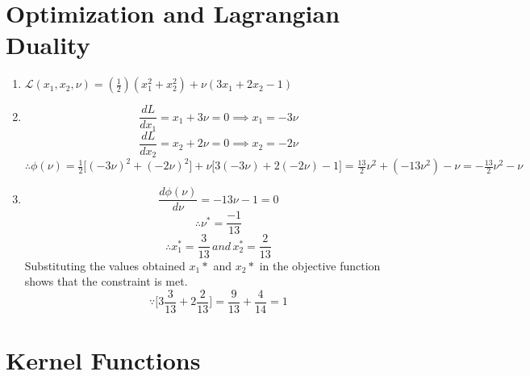 \documentclass[english]{article}
\begin{document}
\section{Optimization and Lagrangian Duality}
\label{sec:optimization}
\begin{enumerate}
	\item 
	${\mathcal{L}}(x_1,x_2,\nu) = (\frac{1}{2})(x_1^2 + x_2^2) + \nu(3x_1 + 2x_2 - 1)$
	\item 
	$$\frac{dL}{dx_1} = x_1 + 3\nu = 0 \implies x_1 = -3\nu$$
	$$\frac{dL}{dx_2} = x_2 + 2\nu = 0 \implies x_2 = -2\nu$$
	$\therefore \phi(\nu) = \frac{1}{2}\big[(-3\nu)^2 + (-2\nu)^2\big] + \nu\big[3(-3\nu) + 2(-2\nu) -1\big] = \frac{13}{2}\nu^2 + (-13\nu^2) -\nu =  -\frac{13}{2}\nu^2 -\nu$
	\item 
	$$\frac{d\phi(\nu)}{d\nu} =  -13\nu -1 = 0$$
	$$\therefore \nu^*= \frac{-1}{13}$$
	$$\therefore x_1^* = \frac{3}{13} \, and \, x_2^* = \frac{2}{13}$$ 
	Substituting the values obtained $x_1*$ and $x_2*$ in the objective function shows that the constraint is met. 
	$$\because \bigg[3\frac{3}{13} + 2\frac{2}{13}\bigg] = \frac{9}{13} + \frac{4}{14} = 1$$
\end{enumerate}


\section{Kernel Functions}
\end{document}
